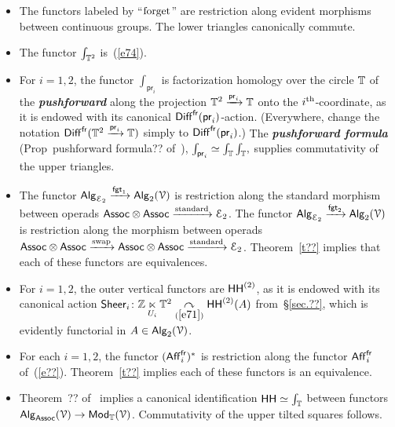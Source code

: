 \documentclass{amsart}
\theoremstyle{definition}
\theoremstyle{remark}
\DeclareMathOperator{\pr}{\mathsf{pr}}
\DeclareMathOperator{\Alg}{\sf Alg}
\DeclareMathOperator{\Mod}{\sf Mod}
\newcommand{\bit}[1]{\textbf{\textit{#1}}}
\newcommand{\lacts}{\curvearrowright}
\DeclareMathOperator{\Diff}{{\sf Diff}}
\DeclareMathOperator{\fr}{\sf fr}
\def\ot{\otimes}
\newcommand{\lag}{\langle}
\newcommand{\rag}{\rangle}
\newcommand{\xra}{\xrightarrow}
\def\cE{\mathcal E}\def\cF{\mathcal F}\def\cG{\mathcal G}\def\cH{\mathcal H}
\DeclareMathOperator{\sHH}{\sf HH}
\DeclareMathOperator{\HHt}{{\sf HH}^{(2)}}
\DeclareMathOperator{\Aff}{\sf Aff}
\begin{document}
\begin{itemize}
\item
The functors labeled by ``$\rm forget$'' are restriction along evident morphisms between continuous groups.  
The lower triangles canonically commute.

\item
The functor $\int_{\mathbb T^2}$ is~(\ref{e74}).

\item
For $i=1,2$, the functor $\int_{\pr_i}$ is factorization homology over the circle $\mathbb T$ of the \bit{pushforward} along the projection $\TT^2 \xra{\pr_i} \TT$ onto the $i^{\rm th}$-coordinate, as it is endowed with its canonical $\Diff^{\fr}(\pr_i)$-action.
{\color{red}
(Everywhere, change the notation $\Diff^{\fr}(\TT^2\xra{\pr_i} \TT)$ simply to $\Diff^{\fr}(\pr_i)$.)
}
The \bit{pushforward formula} (Prop~{pushforward formula??} of~\cite{oldfact}),
$
\int_{\pr_i}
\simeq
\int_{\TT}
\int_{\TT}
,
$
supplies commutativity of the upper triangles.  


\item
The functor $\Alg_{\cE_2} \xra{{\sf fgt}_1} \Alg_2(\cV)$ is restriction along the standard morphism between operads ${\sf Assoc}\ot {\sf Assoc} \xra{\rm standard} \cE_2$.
The functor $\Alg_{\cE_2} \xra{{\sf fgt}_2} \Alg_2(\cV)$ is restriction along the morphism between operads ${\sf Assoc}\ot {\sf Assoc} \xra{\rm swap} {\sf Assoc}\ot {\sf Assoc} \xra{\rm standard} \cE_2$.
Theorem~\ref{t??} implies that each of these functors are equivalences.  

\item
For $i=1,2$, the outer vertical functors are $\HHt$, as it is endowed with its canonical action
${\sf Sheer}_i\colon \ZZ \underset{U_i}\ltimes \TT^2 \underset{(\ref{e71})}\lacts \HHt(A)$ from~\S\ref{sec.??}, which is evidently functorial in $A\in \Alg_2(\cV)$.  



\item
For each $i=1,2$, the functor $(\Aff_i^{\fr})^\ast$ is restriction along the functor $\Aff_i^{\fr}$ of~(\ref{e??}).
Theorem~\ref{t??} implies each of these functors is an equivalence.


\item
Theorem~?? of~\cite{old.fact} implies a canonical identification $\sHH \simeq \int_{\TT}$ between functors $\Alg_{\sf Assoc}(\cV) \to \Mod_{\TT}(\cV)$.
Commutativity of the upper tilted squares follows.  






\end{itemize}
\end{document}
